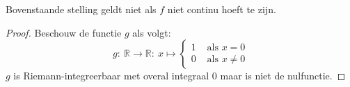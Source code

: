 \documentclass[main.tex]{subfiles}
\begin{document}
\begin{tvb}
  Bovenstaande stelling geldt niet als $f$ niet continu hoeft te zijn.

  \begin{proof}
    Beschouw de functie $g$ als volgt:
    \[
    g:\ \mathbb{R} \rightarrow \mathbb{R}:\ x \mapsto
    \begin{cases}
      1 &\text{ als } x = 0\\
      0 &\text{ als } x \neq 0
    \end{cases}
    \]
    $g$ is Riemann-integreerbaar met overal integraal $0$ maar is niet de nulfunctie.
  \end{proof}
\end{tvb}
\end{document}
